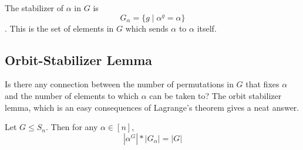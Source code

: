 The stabilizer of $\alpha$ in $G$ is $$G_{\alpha} = \{g \mid \alpha^g = \alpha\}$$. This is the set of elements in $G$ which sends $\alpha$ to $\alpha$ itself. 

\subsection{Orbit-Stabilizer Lemma}

Is there any connection between the number of permutations in $G$ that fixes $\alpha$ and the number of elements to which $\alpha$ can be taken to? The orbit stabilizer lemma, which is an easy consequences of Lagrange's theorem gives a neat answer.

\begin{lemma}
Let $G\leq S_n$. Then for any $\alpha \in [n]$,
$$|\alpha^G|*|G_{\alpha}| = |G|$$
\end{lemma}
